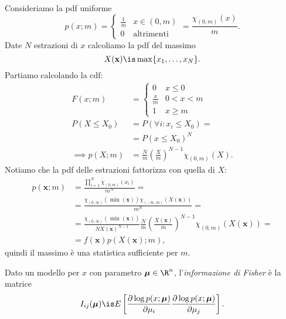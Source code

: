 
\begin{example}
	Consideriamo la pdf uniforme
	\begin{equation*}
		p(x;m) = \begin{cases}
			\frac1m & x\in(0,m) \\
			0 & \text{altrimenti}
		\end{cases}
		= \frac{\chi_{(0,m)}(x)}m.
	\end{equation*}
	Date $N$ estrazioni di $x$ calcoliamo la pdf del massimo
	\begin{equation*}
		X(\mathbf x) \is \max\{x_1,\dotsc,x_N\}.
	\end{equation*}
	Partiamo calcolando la cdf:
	\begin{align*}
		F(x;m) &= \begin{cases}
			0 & x \le 0 \\
			\frac xm & 0 < x < m \\
			1 & x \ge m
		\end{cases} \\
		P(X\le X_0)
		&= P(\forall i:x_i\le X_0) = \\
		&= P(x \le X_0)^N \\
		\implies
		p(X;m) &= \frac Nm \left( \frac Xm \right)^{N-1} \chi_{(0,m)}(X).
	\end{align*}
	Notiamo che la pdf delle estrazioni fattorizza con quella di $X$:
	\begin{align*}
		p(\mathbf x;m)
		&= \frac{\prod_{i=1}^N \chi_{(0,m)}(x_i)}{m^N} = \\
		&= \frac{\chi_{(0,\infty)}(\min(\mathbf x))\chi_{(-\infty,m)}(X(\mathbf x))}{m^N} = \\
		&= \frac{\chi_{(0,\infty)}(\min(\mathbf x))}{N X(\mathbf x)^{N-1}}
		\frac Nm \left( \frac{X(\mathbf x)}m \right)^{N-1} \chi_{(0,m)}(X(\mathbf x)) = \\
		&= f(\mathbf x) p(X(\mathbf x);m),
	\end{align*}
	quindi il massimo è una statistica sufficiente per $m$.
\end{example}

\begin{definition}
	Dato un modello per $x$ con parametro $\boldsymbol\mu\in\R^n$,
	l'\emph{informazione di Fisher} è la matrice
	\begin{equation*}
		I_{ij}(\boldsymbol\mu) \is E \left[
		\frac{\partial\log p(x;\boldsymbol\mu)}{\partial\mu_i}
		\frac{\partial\log p(x;\boldsymbol\mu)}{\partial\mu_j} \right].
	\end{equation*}
\end{definition}

